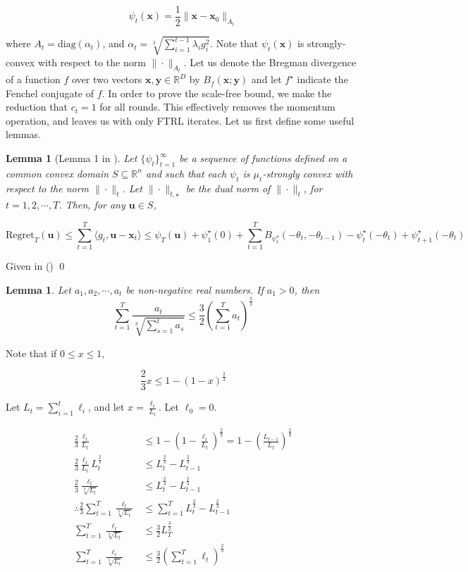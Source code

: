 \documentclass{article}
\newtheorem{lemma}[theorem]{Lemma}
\newcommand{\R}{\mathbb{R}}
\newcommand{\Regret}{\text{Regret}}
\newcommand{\diag}{\text{diag}}
\newcommand{\bx}{\mathbf{x}}
\newcommand{\by}{\mathbf{y}}
\newcommand{\bu}{\mathbf{u}}
\begin{document}
\[
  \psi_t(\bx) = \frac{1}{2} \|\bx - \bx_0 \|_{A_t}
\]

where $A_t = \diag(\alpha_t)$, and $\alpha_t = \sqrt[3]{\sum\limits_{i=1}^{t-1}\lambda_i g_i^2}$. Note that
$\psi_t(\bx)$ is strongly-convex with respect to the norm $\| \cdot \|_{A_t}$. Let us denote the Bregman divergence of a
function $f$ over two vectors $\bx, \by \in \R^D$ by $B_f(\bx; \by)$ and let $f^\star$ indicate the Fenchel conjugate of
$f$. In order to prove the scale-free bound, we make the reduction that $c_t = 1$ for all rounds. This effectively
removes the momentum operation, and leaves us with only FTRL iterates. Let us first define some useful lemmas.

\begin{lemma}[Lemma 1 in \cite{orabona_generalized_2014}]
  Let $\{\psi_t\}_{t=1}^\infty$ be a sequence of functions defined on a common convex domain $S \subseteq \R^n$ and
  such that each $\psi_t$ is $\mu_t$-strongly convex with respect to the norm $\|\cdot\|_t$. Let $\|\cdot\|_{t, \star}$ be
  the dual norm of $\| \cdot \|_t$, for $t = 1, 2, \cdots, T$. Then, for any $\bu \in S$,

  \[
    \Regret _T (\bu) \leq \sum\limits_{t=1}^T \langle g_t, \bu - \bx_t \rangle \leq \psi_{T}(\bu) + \psi_{1}^\star (0) +
    \sum\limits_{t=1}^T B_{\psi_{t}^\star}(-\theta_t, -\theta_{t-1}) - \psi_{t}^\star (-\theta_t) +
    \psi_{t+1}^\star(-\theta_t)
  \]
\end{lemma}

\proof Given in (\cite{orabona_generalized_2014})
\qed

\begin{lemma}
  Let $a_1, a_2, \cdots, a_t$ be non-negative real numbers. If $a_1 > 0$, then
  \[
    \sum\limits_{t=1}^T \frac{a_t}{\sqrt[3]{\sum\limits_{s=1}^t a_s}} \leq \frac{3}{2}\left(\sum\limits_{t=1}^T
    a_t\right)^\frac{2}{3}
  \]
\end{lemma}

\proof Note that if $0 \leq x \leq 1$, 

\[
  \frac{2}{3} x \leq 1 - (1 - x)^\frac{2}{3}
\]

Let $L_t = \sum\limits_{i=1}^t \ell_i$, and let $x = \frac{\ell_t}{L_t}$. Let $\ell_0 = 0$.

\begin{align*}
  \frac{2}{3} \frac{\ell_t}{L_t}
  &\leq 1 - (1 - \frac{\ell_t}{L_t})^\frac{2}{3} = 1 - (\frac{L_{t-1}}{L_t})^\frac{2}{3} \\
  \frac{2}{3} \frac{\ell_t}{L_t} L_{t}^\frac{2}{3} &\leq L_{t}^\frac{2}{3} - L_{t-1}^\frac{2}{3} \\
  \frac{2}{3} \frac{\ell_t}{\sqrt[3]{L_t}} &\leq L_{t}^\frac{2}{3} - L_{t-1}^\frac{2}{3} \\
  \therefore \frac{2}{3} \sum\limits_{t=1}^T \frac{\ell_t}{\sqrt[3]{L_t}} &\leq \sum\limits_{t=1}^T L_{t}^\frac{2}{3} -
  L_{t-1}^\frac{2}{3} \\
  \sum\limits_{t=1}^T \frac{\ell_t}{\sqrt[3]{L_t}} &\leq \frac{3}{2} L_{T}^\frac{3}{2} \\
  \sum\limits_{t=1}^T \frac{\ell_t}{\sqrt[3]{L_t}} &\leq \frac{3}{2} \left(\sum\limits_{t=1}^T \ell_t \right)^\frac{2}{3}
\end{align*}
\end{document}
